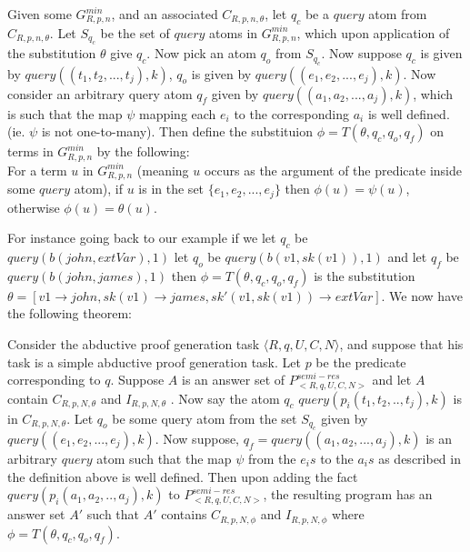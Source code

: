 \begin{definition}\label{def:derivesub}
Given some $G_{R,p,n}^{min}$, and an associated $C_{R,p,n,\theta}$, let $q_{c}$ be a $query$ atom from $C_{R,p,n,\theta}$. Let $S_{q_{c}}$ be the set of $query$ atoms in $G_{R,p,n}^{min}$, which upon application of the substitution $\theta$ give $q_{c}$. Now pick an atom $q_{o}$ from $S_{q_{c}}$. Now suppose $q_{c}$ is given by $query((t_{1},t_{2},...,t_{j}),k)$, $q_{o}$ is given by $query((e_{1},e_{2},...,e_{j}),k)$. Now consider an arbitrary query atom $q_{f}$ given by $query((a_{1},a_{2},...,a_{j}),k)$, which is such that the map $\psi$ mapping each $e_{i}$ to the corresponding $a_{i}$ is well defined. (ie. $\psi$ is not one-to-many). Then define the substituion $\phi = T(\theta, q_{c},q_{o},q_{f})$ on terms in $G_{R,p,n}^{min}$ by the following:\\ For a term $u$ in $G_{R,p,n}^{min}$ (meaning $u$ occurs as the argument of the predicate inside some $query$ atom), if $u$ is in the set $\{e_{1},e_{2},...,e_{j}\}$ then $\phi(u) = \psi(u)$, otherwise $\phi(u) = \theta(u)$.
\end{definition}
For instance going back to our example if we let $q_{c}$ be\\
$query(b(john,extVar),1)$ let $q_{o}$ be $query(b(v1,sk(v1)),1)$ and let $q_{f}$ be $query(b(john,james),1)$ then $\phi=T(\theta,q_{c},q_{o},q_{f})$ is the substitution $\theta =[v1\rightarrow john,sk(v1) \rightarrow james, sk'(v1,sk(v1))\rightarrow extVar]$. We now have the following theorem:
\begin{theorem}\label{thm:termsub}
Consider the abductive proof generation task $\langle R,q,U,C,N\rangle$, and suppose that his task is a simple abductive proof generation task. Let $p$ be the predicate corresponding to $q$. Suppose $A$ is an answer set of $P^{semi-res}_{<R,q,U,C,N>}$ and let $A$ contain $C_{R,p,N,\theta}$ and $I_{R,p,N,\theta}$ . Now
say the atom $q_{c}$ $query(p_{i}(t_{1},t_{2},..,t_{j}),k)$ is in
$C_{R,p,N,\theta}$. Let $q_{o}$ be some query atom from the set $S_{q_{c}}$
given by $query((e_{1},e_{2},...,e_{j}),k)$. Now suppose, $q_{f}=
query((a_{1},a_{2},...,a_{j}),k)$ is an arbitrary $query$ atom such that the
map $\psi$ from the $e_{i}s$ to the $a_{i}s$ as described in the definition
above is well defined. Then upon adding the fact
$query(p_{i}(a_{1},a_{2},..,a_{j}),k)$ to $P^{semi-res}_{<R,q,U,C,N>}$,
the resulting program has an answer set $A'$ such that $A'$ contains
$C_{R,p,N,\phi}$ and $I_{R,p,N,\phi}$  where $\phi = T(\theta, q_{c}, q_{o}, q_{f})$.
\end{theorem}

